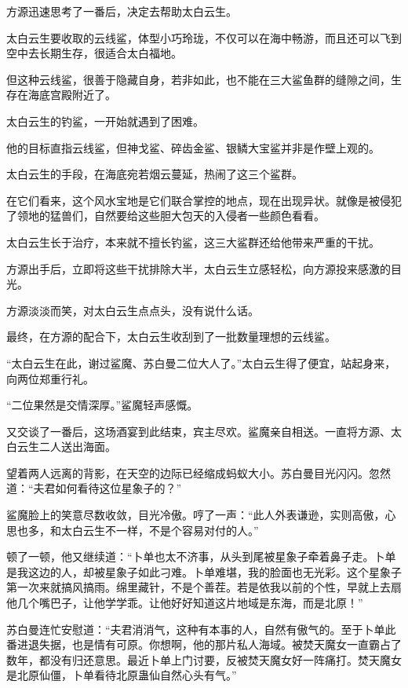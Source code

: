 
\begin{this_body}



方源迅速思考了一番后，决定去帮助太白云生。

太白云生要收取的云线鲨，体型小巧玲珑，不仅可以在海中畅游，而且还可以飞到空中去长期生存，很适合太白福地。

但这种云线鲨，很善于隐藏自身，若非如此，也不能在三大鲨鱼群的缝隙之间，生存在海底宫殿附近了。

太白云生的钓鲨，一开始就遇到了困难。

他的目标直指云线鲨，但神戈鲨、碎齿金鲨、银鳞大宝鲨并非是作壁上观的。

太白云生的手段，在海底宛若烟云蔓延，热闹了这三个鲨群。

在它们看来，这个风水宝地是它们联合掌控的地点，现在出现异状。就像是被侵犯了领地的猛兽们，自然要给这些胆大包天的入侵者一些颜色看看。

太白云生长于治疗，本来就不擅长钓鲨，这三大鲨群还给他带来严重的干扰。

方源出手后，立即将这些干扰排除大半，太白云生立感轻松，向方源投来感激的目光。

方源淡淡而笑，对太白云生点点头，没有说什么话。

最终，在方源的配合下，太白云生收刮到了一批数量理想的云线鲨。

“太白云生在此，谢过鲨魔、苏白曼二位大人了。”太白云生得了便宜，站起身来，向两位郑重行礼。

“二位果然是交情深厚。”鲨魔轻声感慨。

又交谈了一番后，这场酒宴到此结束，宾主尽欢。鲨魔亲自相送。一直将方源、太白云生二人送出海面。

望着两人远离的背影，在天空的边际已经缩成蚂蚁大小。苏白曼目光闪闪。忽然道：“夫君如何看待这位星象子的？”

鲨魔脸上的笑意尽数收敛，目光冷傲。哼了一声：“此人外表谦逊，实则高傲，心思也多，和太白云生不一样，不是个容易对付的人。”

顿了一顿，他又继续道：“卜单也太不济事，从头到尾被星象子牵着鼻子走。卜单是我这边的人，却被星象子如此刁难。卜单难堪，我的脸面也无光彩。这个星象子第一次来就搞风搞雨。绵里藏针，不是个善茬。若是依我以前的个性，早就上去扇他几个嘴巴子，让他学学乖。让他好好知道这片地域是东海，而是北原！”

苏白曼连忙安慰道：“夫君消消气，这种有本事的人，自然有傲气的。至于卜单此番进退失据，也是情有可原。你想啊，他的那片私人海域。被焚天魔女一直霸占了数年，都没有归还意思。最近卜单上门讨要，反被焚天魔女好一阵痛打。焚天魔女是北原仙僵，卜单看待北原蛊仙自然心头有气。”


\end{this_body}
